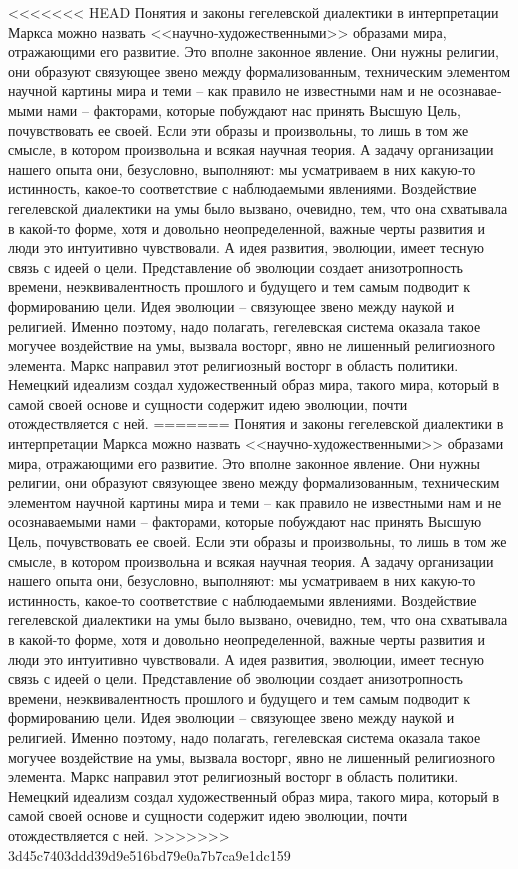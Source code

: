 \documentclass{book}
\begin{document}
<<<<<<< HEAD
Понятия и законы гегелевской диалектики в интерпретации Маркса можно назвать <<научно‑художественными>> образами мира, отражающими его развитие. Это вполне законное явле­ние. Они нужны религии, они образуют связующее звено между формализованным, техническим элементом научной картины мира и теми -- как правило не известными нам и не осознавае­мыми нами -- факторами, которые побуждают нас принять Выс­шую Цель, почувствовать ее своей. Если эти образы и произ­вольны, то лишь в том же смысле, в котором произвольна и всякая научная теория. А задачу организации нашего опыта они, безусловно, выполняют: мы усматриваем в них какую‑то истинность, какое‑то соответствие с наблюдаемыми явлениями. Воздействие гегелевской диалектики на умы было вызвано, очевидно, тем, что она схватывала в какой‑то форме, хотя и до­вольно неопределенной, важные черты развития и люди это интуитивно чувствовали. А идея развития, эволюции, имеет тес­ную связь с идеей о цели. Представление об эволюции создает анизотропность времени, неэквивалентность прошлого и будущего и тем самым подводит к формированию цели. Идея эволюции -- связующее звено между наукой и религией. Именно поэтому, надо полагать, гегелевская система оказала такое могучее воздействие на умы, вызвала восторг, явно не лишенный религиозного элемента. Маркс направил этот религиозный восторг в область политики. Немецкий идеализм создал художественный образ мира, такого мира, который в самой своей основе и сущности содержит идею эволюции, почти отождествляется с ней.
=======
Понятия и законы гегелевской диалектики в интерпретации Маркса можно назвать <<научно-художественными>> образами мира, отражающими его развитие. Это вполне законное явле­ние. Они нужны религии, они образуют связующее звено между формализованным, техническим элементом научной картины мира и теми -- как правило не известными нам и не осознавае­мыми нами -- факторами, которые побуждают нас принять Выс­шую Цель, почувствовать ее своей. Если эти образы и произ­вольны, то лишь в том же смысле, в котором произвольна и всякая научная теория. А задачу организации нашего опыта они, безусловно, выполняют: мы усматриваем в них какую-то истинность, какое-то соответствие с наблюдаемыми явлениями. Воздействие гегелевской диалектики на умы было вызвано, очевидно, тем, что она схватывала в какой-то форме, хотя и до­вольно неопределенной, важные черты развития и люди это интуитивно чувствовали. А идея развития, эволюции, имеет тес­ную связь с идеей о цели. Представление об эволюции создает анизотропность времени, 
неэквивалентность прошлого и будущего и тем самым подводит к формированию цели. Идея эволюции -- связующее звено между наукой и религией. Именно поэтому, надо полагать, гегелевская система оказала такое могучее воздействие на умы, вызвала восторг, явно не лишенный религиозного элемента. Маркс направил этот религиозный восторг в область политики. Немецкий идеализм создал художественный образ мира, такого мира, который в самой своей основе и сущности содержит идею эволюции, почти отождествляется с ней.
>>>>>>> 3d45c7403ddd39d9e516bd79e0a7b7ca9e1dc159
\end{document}

